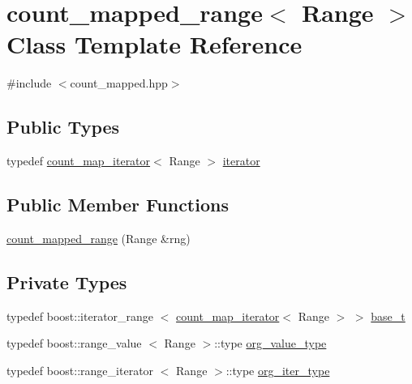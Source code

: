 \hypertarget{classyuh_1_1range__detail_1_1count__mapped__range}{\section{count\-\_\-mapped\-\_\-range$<$ \-Range $>$ \-Class \-Template \-Reference}
\label{dc/d9d/classyuh_1_1range__detail_1_1count__mapped__range}
}


{\ttfamily \#include $<$count\-\_\-mapped.\-hpp$>$}

\subsection*{\-Public \-Types}
\begin{DoxyCompactItemize}
\item 
typedef \hyperlink{classyuh_1_1range__detail_1_1count__map__iterator}{count\-\_\-map\-\_\-iterator}$<$ \-Range $>$ \hyperlink{classyuh_1_1range__detail_1_1count__mapped__range_a01b1f59fe1260c78c27cae74822ff00f}{iterator}
\end{DoxyCompactItemize}
\subsection*{\-Public \-Member \-Functions}
\begin{DoxyCompactItemize}
\item 
\hyperlink{classyuh_1_1range__detail_1_1count__mapped__range_a69356d8bf5008cd44af94ba8ace19ce8}{count\-\_\-mapped\-\_\-range} (\-Range \&rng)
\end{DoxyCompactItemize}
\subsection*{\-Private \-Types}
\begin{DoxyCompactItemize}
\item 
typedef boost\-::iterator\-\_\-range\*
$<$ \hyperlink{classyuh_1_1range__detail_1_1count__map__iterator}{count\-\_\-map\-\_\-iterator}$<$ \-Range $>$ $>$ \hyperlink{classyuh_1_1range__detail_1_1count__mapped__range_aa0cbd1ef3bd1e7da04065061ffa97ccf}{base\-\_\-t}
\item 
typedef boost\-::range\-\_\-value\*
$<$ \-Range $>$\-::type \hyperlink{classyuh_1_1range__detail_1_1count__mapped__range_a69559cacbf423e64c6efb8e1644ea37e}{org\-\_\-value\-\_\-type}
\item 
typedef boost\-::range\-\_\-iterator\*
$<$ \-Range $>$\-::type \hyperlink{classyuh_1_1range__detail_1_1count__mapped__range_a7d85ad9a5f85d7a869dd7ea9557eee8b}{org\-\_\-iter\-\_\-type}
\end{DoxyCompactItemize}



